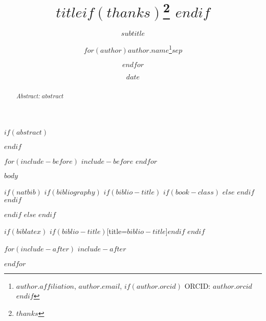\documentclass[11pt, a4paper, oneside]{article}
\title{$title$$if(thanks)$\thanks{$thanks$} $endif$ }
\subtitle{$subtitle$}
\author{$for(author)$$author.name$\thanks{$author.affiliation$, \texttt{$author.email$}, $if(author.orcid)$ ORCID: \href{https://orcid.org/$author.orcid$}{$author.orcid$}$endif$}$sep$\and $endfor$}
\institute{$for(author)$$author.affiliation$$sep$ \and $endfor$}
\date{$date$}
\begin{document}

\thispagestyle{firstpagestyle}


\normalsize
\pagestyle{fancy}

$if(abstract)$
\begin{abstract}
\vspace{-1cm}\noindent \emph{Abstract:} $abstract$
\end{abstract}
$endif$

$for(include-before)$
$include-before$
$endfor$

$body$

$if(natbib)$
  $if(bibliography)$
    $if(biblio-title)$
      $if(book-class)$
        \renewcommand\bibname{$biblio-title$}
      $else$
        \renewcommand\refname{$biblio-title$}
      $endif$
    $endif$
    
  $endif$
$else$
$endif$

$if(biblatex)$
\printbibliography$if(biblio-title)$[title=$biblio-title$]$endif$
$endif$

$for(include-after)$
$include-after$

$endfor$
\end{document}
